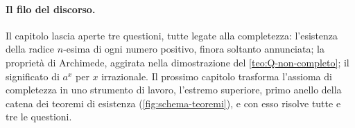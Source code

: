 \paragraph{Il filo del discorso.} Il capitolo lascia aperte tre questioni, tutte legate
alla completezza: l'esistenza della radice $n$-esima di ogni numero positivo, finora
soltanto annunciata; la proprietà di Archimede, aggirata nella dimostrazione del
\cref{teo:Q-non-completo}; il significato di $a^{x}$ per $x$ irrazionale. Il prossimo
capitolo trasforma l'assioma di completezza in uno strumento di lavoro, l'estremo
superiore, primo anello della catena dei teoremi di esistenza
(\cref{fig:schema-teoremi}), e con esso risolve tutte e tre le questioni.
